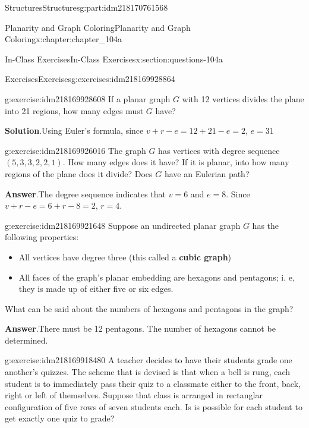 \documentclass[oneside,10pt,]{book}
\newcommand{\blocktitlefont}{\relax}
\newcommand{\terminology}[1]{\textbf{#1}}
\numberwithin{equation}{section}
\begin{document}
\begin{partptx}{Structures}{}{Structures}{}{}{g:part:idm218170761568}
\begin{chapterptx}{Planarity and Graph Coloring}{}{Planarity and Graph Coloring}{}{}{x:chapter:chapter_104a}
\begin{sectionptx}{In-Class Exercises}{}{In-Class Exercises}{}{}{x:section:questions-104a}
\begin{exercises-subsection-numberless}{Exercises}{}{Exercises}{}{}{g:exercises:idm218169928864}
%
\begin{exercisegroup}
\begin{divisionexerciseeg}{1}{}{}{g:exercise:idm218169928608}%
If a planar graph \(G\) with 12 vertices divides the plane into 21 regions, how many edges must \(G\) have?%
\par\smallskip%
\noindent\textbf{\blocktitlefont Solution}.\hypertarget{g:solution:idm218169927248}{}\quad{}Using Euler's formula, since \(v+r-e=12+21-e=2\), \(e=31\)%
\end{divisionexerciseeg}%
\begin{divisionexerciseeg}{2}{}{}{g:exercise:idm218169926016}%
%
The graph \(G\) has vertices with degree sequence \((5, 3, 3, 2, 2, 1)\). How many edges does it have? If it is planar, into how many regions of the plane does it divide?  Does \(G\) have an Eulerian path?%
\par\smallskip%
\noindent\textbf{\blocktitlefont Answer}.\hypertarget{g:answer:idm218169923824}{}\quad{}The degree sequence indicates that \(v=6\) and \(e=8\). Since \(v +r - e=6+r-8=2\), \(r = 4\).%
\end{divisionexerciseeg}%
\begin{divisionexerciseeg}{3}{}{}{g:exercise:idm218169921648}%
Suppose an undirected planar graph \(G\) has the following properties:%
\begin{itemize}[label=\textbullet]
\item{}All vertices have degree three (this called a \terminology{cubic graph})%
\item{}All faces of the graph's planar embedding are hexagons and pentagons; i. e, they is made up of either five or six edges.%
\end{itemize}
What can be said about the numbers of hexagons and pentagons in the graph?%
\par\smallskip%
\noindent\textbf{\blocktitlefont Answer}.\hypertarget{g:answer:idm218169918864}{}\quad{}There must be 12 pentagons. The number of hexagons cannot be determined.%
\end{divisionexerciseeg}%
\begin{divisionexerciseeg}{4}{}{}{g:exercise:idm218169918480}%
A teacher decides to have their students grade one another's quizzes.  The scheme that is devised is that when a bell is rung, each  student is to immediately pass their quiz to a classmate either to the front, back, right or left of themselves.  Suppose that class is arranged in rectanglar configuration of five rows of seven students each. Is is possible for each student to get exactly one quiz to grade?%

\end{divisionexerciseeg}
\end{exercisegroup}
\end{exercises-subsection-numberless}
\end{sectionptx}
\end{chapterptx}
\end{partptx}
\end{document}
